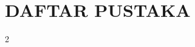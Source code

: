 \documentclass[11pt,a4paper,oneside]{article}
\begin{document}


\setcounter{page}{2}











\vspace{6pt}
\section*{DAFTAR PUSTAKA}
\renewcommand{\bibsection}{}
\renewcommand{\bibfont}{\scriptsize\setlength{\parskip}{0pt}\setlength{\itemsep}{0pt}}
\setlength{\bibsep}{0pt}
\begin{multicols}{2}


\end{multicols}
\end{document}
